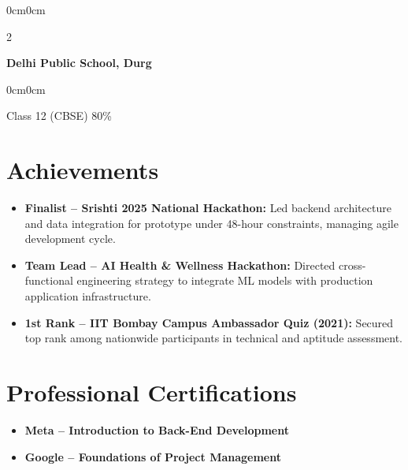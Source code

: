 \documentclass[10pt, letterpaper]{article}
\newenvironment{highlights}{
    \begin{itemize}[topsep=0pt, parsep=0pt, partopsep=0pt, itemsep=1.2pt, leftmargin=10pt]
}{
    \end{itemize}
}
\newenvironment{onecolentry}{
    \begin{adjustwidth}{0cm}{0cm}
}{
    \end{adjustwidth}
}
\newenvironment{twocolentry}[2][]{
    \onecolentry
    \def\secondColumn{#2}
    \setcolumnwidth{\fill, 4.5cm}
    \begin{paracol}{2}
}{
    \switchcolumn \raggedleft \secondColumn
    \end{paracol}
    \endonecolentry
}
\begin{document}
\vspace{0.08cm}

\begin{twocolentry}{2022}
    \textbf{Delhi Public School, Durg}
\end{twocolentry}
\begin{onecolentry}
    Class 12 (CBSE) \textbar{} 80\%
\end{onecolentry}

\section{Achievements}
\begin{highlights}
    \item \textbf{Finalist – Srishti 2025 National Hackathon:} Led backend architecture and data integration for prototype under 48-hour constraints, managing agile development cycle.
    \item \textbf{Team Lead – AI Health \& Wellness Hackathon:} Directed cross-functional engineering strategy to integrate ML models with production application infrastructure.
    \item \textbf{1st Rank – IIT Bombay Campus Ambassador Quiz (2021):} Secured top rank among nationwide participants in technical and aptitude assessment.
\end{highlights}

\section{Professional Certifications}
\begin{highlights}
    \item \textbf{Meta – Introduction to Back-End Development} \href{https://coursera.org/share/2eba42fa7f25697b67aa6db80c581ed6}{\faLink}
    \item \textbf{Google – Foundations of Project Management} \href{https://coursera.org/share/c48322f244b9763d2fa143bc23ac9d26}{\faLink}
\end{highlights}
\end{document}
